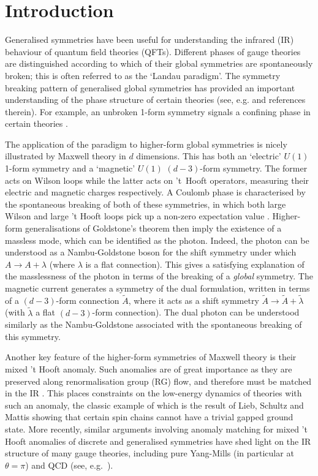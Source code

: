 \section{Introduction}
\label{sec:intro}

Generalised symmetries have been useful for understanding the infrared (IR) behaviour of quantum field theories (QFTs).
Different phases of gauge theories are distinguished according to which of their global symmetries are spontaneously broken; this is often referred to as the `Landau paradigm'.
The symmetry breaking pattern of
generalised global symmetries has provided an important understanding of the phase structure of certain theories (see, e.g. \cite{McGreevy:2022oyu, Bhardwaj:2023fca, Bhardwaj:2024wlr} and references therein).
For example, an unbroken 1-form symmetry signals a confining phase in certain theories \cite{Gaiotto2015GeneralizedSymmetries}.

The application of the paradigm to higher-form global symmetries is nicely illustrated by Maxwell theory in $d$ dimensions. This has both an `electric' $U(1)$ 1-form symmetry and a `magnetic' $U(1)$ $(d-3)$-form symmetry. The former acts on Wilson loops while the latter acts on 't~Hooft operators, measuring their electric and magnetic charges respectively. A Coulomb phase is characterised by the spontaneous breaking of both of these symmetries, in which both large Wilson and large 't Hooft loops pick up a non-zero expectation value \cite{Gaiotto2015GeneralizedSymmetries}. Higher-form generalisations of Goldstone's theorem \cite{Hofman:2018lfz, Lake:2018dqm} then imply the existence of a massless mode, which can be identified as the photon. Indeed, the photon can be understood as a Nambu-Goldstone boson for the  shift symmetry under which $A\to A+\lambda$ (where $\lambda$ is a flat connection).
This gives a satisfying explanation of the masslessness of the photon in terms of the breaking of a \emph{global} symmetry.
The magnetic current generates a symmetry of the dual formulation, written in terms of a $(d-3)$-form connection $\tilde{A}$, where it acts as a shift symmetry $\tilde{A} \to \tilde{A} + \tilde{\lambda}$ (with $\tilde{\lambda}$ a flat $(d-3)$-form connection). The dual photon can be understood similarly as the Nambu-Goldstone associated with the spontaneous breaking of this symmetry.

Another key feature of the higher-form symmetries of Maxwell theory is their mixed 't Hooft anomaly.
Such anomalies are of great importance as they are preserved along renormalisation group (RG) flow, and therefore must be matched in the IR \cite{tHooft:1979rat}. 
This places constraints on the low-energy dynamics of theories with such an anomaly, the classic example of which is the result of Lieb, Schultz and Mattis \cite{Lieb:1961fr} showing that certain spin chains cannot have a trivial gapped ground state.
More recently, similar arguments involving anomaly matching for mixed 't Hooft anomalies of discrete and generalised symmetries have shed light on the IR structure of many gauge theories, including pure Yang-Mills (in particular at $\theta=\pi$) and QCD (see, e.g.\  \cite{Gaiotto:2017yup, Cordova:2019bsd, Cordova:2019jnf, Cordova:2019uob, Brennan:2024tlw, Brennan:2023ynm, Apte:2022xtu, Cordova:2019jqi}). 

